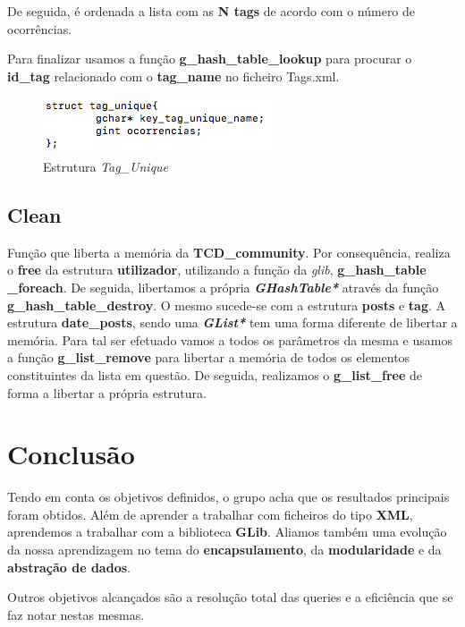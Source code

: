 \documentclass[a4paper]{article}
\begin{document}
De seguida, é ordenada a lista com as \textbf{N tags} de acordo com o
número de ocorrências. 

Para finalizar usamos a função \textbf{g\_hash\_table\_lookup} para procurar
o \textbf{id\_tag} relacionado com o \textbf{tag\_name} no ficheiro Tags.xml.

\begin{figure}[H]
\centering
\includegraphics[scale=0.70]{image_tag_unique}
\caption{Estrutura \textit{Tag\_Unique}}
\label{img:tag_unique}
\end{figure}

\subsection{Clean}

Função que liberta a memória da \textbf{TCD\_community}. Por consequência,
realiza o \textbf{free} da estrutura \textbf{utilizador}, utilizando a 
função da \textit{glib}, \textbf{g\_hash\_table} \textbf{\_foreach}. 
De seguida, libertamos a própria \textit{\textbf{GHashTable*}} através da 
função \textbf{g\_hash\_table\_destroy}. O mesmo sucede-se com a estrutura
\textbf{posts} e \textbf{tag}. A estrutura \textbf{date\_posts}, sendo
uma \textit{\textbf{GList*}} tem uma forma diferente de libertar a 
memória. Para tal ser efetuado vamos a todos os parâmetros da mesma
e usamos a função \textbf{g\_list\_remove} para libertar a memória
de todos os elementos constituintes da lista em questão. De seguida,
realizamos o \textbf{g\_list\_free} de forma a libertar a própria 
estrutura.

\section{Conclusão}
\label{sec:conclusao}

Tendo em conta os objetivos definidos, o grupo acha que os resultados 
principais foram obtidos. Além de aprender a trabalhar com ficheiros 
do tipo \textbf{XML}, aprendemos a trabalhar com a biblioteca \textbf{GLib}.
Aliamos também uma evolução da nossa aprendizagem no tema do 
\textbf{encapsulamento}, da \textbf{modularidade} e 
da \textbf{abstração de dados}.

Outros objetivos alcançados são a resolução total das queries e a eficiência
que se faz notar nestas mesmas.
\end{document}
